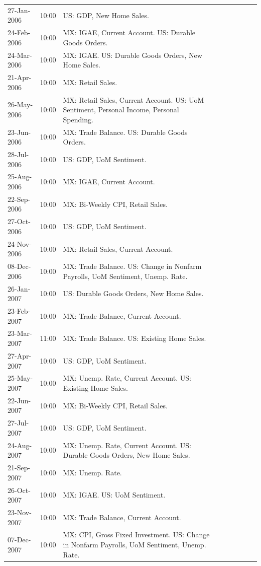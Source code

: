 \documentclass[a4paper,12pt]{article} 		%
\begin{document}
\begin{tiny}
\begin{center}
\begin{longtable}{p{1.8cm}p{1cm}p{11.7cm}p{1.8cm}p{1cm}p{11.7cm}p{1.8cm}p{1cm}p{11.7cm}}
			27-Jan-2006 & 10:00 & US: GDP, New Home Sales. \\
			24-Feb-2006 & 10:00 & MX: IGAE, Current Account. US: Durable Goods Orders. \\
			24-Mar-2006 & 10:00 & MX: IGAE. US: Durable Goods Orders, New Home Sales. \\
			21-Apr-2006 & 10:00 & MX: Retail Sales. \\
			26-May-2006 & 10:00 & MX: Retail Sales, Current Account. US: UoM Sentiment, Personal Income, Personal Spending. \\
			23-Jun-2006 & 10:00 & MX: Trade Balance. US: Durable Goods Orders. \\
			28-Jul-2006 & 10:00 & US: GDP, UoM Sentiment. \\
			25-Aug-2006 & 10:00 & MX: IGAE, Current Account. \\
			22-Sep-2006 & 10:00 & MX: Bi-Weekly CPI, Retail Sales. \\
			27-Oct-2006 & 10:00 & US: GDP, UoM Sentiment. \\
			24-Nov-2006 & 10:00 & MX: Retail Sales, Current Account. \\
			08-Dec-2006 & 10:00 & MX: Trade Balance. US: Change in Nonfarm Payrolls, UoM Sentiment, Unemp. Rate. \\
			26-Jan-2007 & 10:00 & US: Durable Goods Orders, New Home Sales. \\
			23-Feb-2007 & 10:00 & MX: Trade Balance, Current Account. \\
			23-Mar-2007 & 11:00 & MX: Trade Balance. US: Existing Home Sales. \\
			27-Apr-2007 & 10:00 & US: GDP, UoM Sentiment. \\
			25-May-2007 & 10:00 & MX: Unemp. Rate, Current Account. US: Existing Home Sales. \\
			22-Jun-2007 & 10:00 & MX: Bi-Weekly CPI, Retail Sales. \\
			27-Jul-2007 & 10:00 & US: GDP, UoM Sentiment. \\
			24-Aug-2007 & 10:00 & MX: Unemp. Rate, Current Account. US: Durable Goods Orders, New Home Sales. \\
			21-Sep-2007 & 10:00 & MX: Unemp. Rate. \\
			26-Oct-2007 & 10:00 & MX: IGAE. US: UoM Sentiment. \\
			23-Nov-2007 & 10:00 & MX: Trade Balance, Current Account. \\
			07-Dec-2007 & 10:00 & MX: CPI, Gross Fixed Investment. US: Change in Nonfarm Payrolls, UoM Sentiment, Unemp. Rate. \\

\end{longtable}
\end{center}
\end{tiny}
\end{document}
